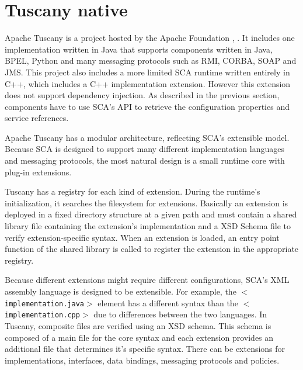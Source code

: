\section{Tuscany native}

Apache Tuscany is a project hosted by the Apache Foundation \cite{Tuscany}, \cite{Laws}. It includes one implementation written
in Java that supports components written in Java, BPEL, Python and many messaging protocols such as RMI, CORBA, SOAP and JMS.
This project also includes a more limited SCA runtime written entirely in C++, which includes a C++ implementation extension.
However this extension does not support dependency injection. As described in the previous section, components have to use
SCA's API to retrieve the configuration properties and service references.

Apache Tuscany has a modular architecture, reflecting SCA's extensible model. Because SCA is designed to support many
different implementation languages and messaging protocols, the most natural design is a small runtime core with plug-in extensions.

Tuscany has a registry for each kind of extension. During the runtime's initialization, it searches the filesystem for
extensions. Basically an extension is deployed in a fixed directory structure at a given path and must contain a shared
library file containing the extension's implementation and a XSD Schema file to verify extension-specific syntax.
When an extension is loaded, an entry point function of the shared library is called to register the extension in
the appropriate registry.

Because different extensions might require different configurations, SCA's XML assembly language is designed to be extensible.
For example, the \texttt{$<$implementation.java$>$} element has a different syntax than the \texttt{$<$implementation.cpp$>$}
due to differences between the two languages. In Tuscany, composite files are verified using an XSD schema. This schema is
composed of a main file for the core syntax and each extension provides an additional file that determines it's specific syntax.
There can be extensions for implementations, interfaces, data bindings, messaging protocols and policies.



